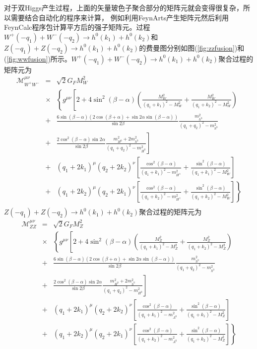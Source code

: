 对于双Higgs产生过程，上面的矢量玻色子聚合部分的矩阵元就会变得很复杂，所以需要结合自动化的程序来计算，
例如利用FeynArts产生矩阵元然后利用FeynCalc\cite{feyncalc}程序包计算平方后的强子矩阵元。过程
$W^+(-q_1) + W^-(-q_2)\rightarrow h^0(k_1) + h^0(k_2)$和
$Z(-q_1) + Z(-q_2)\rightarrow h^0(k_1) + h^0(k_2)$的费曼图分别如图(\ref{fig:zzfusion})和
(\ref{fig:wwfusion})所示。$W^+(-q_1) + W^-(-q_2) \to h^0(k_1) + h^0(k_2)$聚合过程的矩阵元为
\begin{eqnarray} \label{eq:WWfusion}
{\mathcal M}^{\mu\nu}_{W^+W^-} &=& \sqrt{2} G_F M_W^2   \nonumber \\
&\times&
\left\{
g^{\mu\nu} \left[ 2 + 4 \sin^2(\beta - \alpha) \left(
\frac{M_W^2}{(q_1 + k_1)^2 - M_W^2} + \frac{M_W^2}{(q_1 + k_2)^2 -
M_W^2} \right) \right.
\right. \nonumber \\
&+&
\left.
\frac{6 \sin(\beta - \alpha) \left(2 \cos(\beta + \alpha) + \sin2\alpha \sin(\beta - \alpha)\right)}{\sin 2\beta}
\frac{m_{h^0}^2}{(q_1 + q_2)^2 - m_{h^0}^2}
\right. \nonumber \\
&+&
\left.
\frac{2 \cos^2(\beta - \alpha) \sin2\alpha}{\sin 2\beta}
\frac{m_{H^0}^2 + 2 m_{h^0}^2}{(q_1 + q_2)^2 - m_{H^0}^2}
\right] \nonumber \\
&+&
\left.
(q_1 + 2 k_1)^{\mu} (q_2 + 2 k_2)^{\nu}
\left[
\frac{\cos^2(\beta - \alpha)}{(q_1 + k_1)^2-m_{H^{\pm}}^2} + \frac{\sin^2(\beta - \alpha)}{(q_1 + k_1)^2 - M_W^2}
\right]
\right. \nonumber \\
&+&
\left.
(q_1 + 2 k_2)^{\mu} (q_2 + 2 k_1)^{\nu}
\left[
\frac{\cos^2(\beta - \alpha)}{(q_1 + k_2)^2-m_{H^{\pm}}^2} + \frac{\sin^2(\beta - \alpha)}{(q_1 + k_2)^2 - M_W^2}
\right]
\right\}
\nonumber \\
\end{eqnarray}
$Z(-q_1) + Z(-q_2) \rightarrow h^0(k_1) + h^0(k_2)$聚合过程的矩阵元为
\begin{eqnarray}
\label{eq:ZZfusion}
{\mathcal M}^{\mu\nu}_{ZZ}
&=&
 \sqrt{2} G_F M_Z^2 \nonumber \\
&\times&
\left\{
g^{\mu\nu}
\left[
2 + 4 \sin^2(\beta - \alpha)
\left(
\frac{M_Z^2}{(q_1 + k_1)^2 - M_Z^2} + \frac{M_Z^2}{(q_1 + k_2)^2 - M_Z^2}
\right)
\right.
\right. \nonumber \\
&+&
\left.
\frac{6 \sin(\beta - \alpha) \left(2 \cos(\beta + \alpha) + \sin2\alpha \sin(\beta - \alpha)\right)}{\sin 2\beta}
\frac{m_{h^0}^2}{(q_1 + q_2)^2 - m_{h^0}^2}
\right. \nonumber \\
&+& 
\left.
\frac{2 \cos^2(\beta - \alpha) \sin2\alpha}{\sin 2\beta}
\frac{m_{H^0}^2 + 2 m_{h^0}^2}{(q_1 + q_2)^2 - m_{H^0}^2}
\right] \nonumber \\
&+&
\left.
(q_1 + 2 k_1)^{\mu} (q_2 + 2 k_2)^{\nu}
\left[
\frac{\cos^2(\beta - \alpha)}{(q_1 + k_1)^2-m_{A^0}^2} + \frac{\sin^2(\beta - \alpha)}{(q_1 + k_1)^2 - M_Z^2}
\right]
\right. \nonumber \\
&+&
\left.
(q_1 + 2 k_2)^{\mu} (q_2 + 2 k_1)^{\nu}
\left[
\frac{\cos^2(\beta - \alpha)}{(q_1 + k_2)^2-m_{A^0}^2} + \frac{\sin^2(\beta - \alpha)}{(q_1 + k_2)^2 - M_Z^2}
\right]
\right\}
\nonumber \\
\end{eqnarray}
